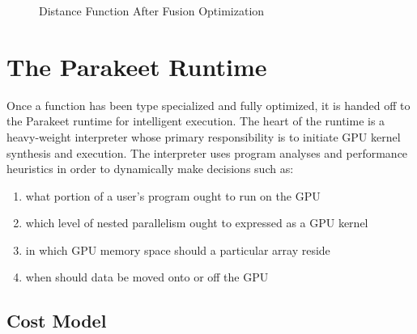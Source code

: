 \documentclass[10pt,twocolumn]{article}
\begin{document}
\begin{figure}[h!]

\caption{Distance Function After Fusion Optimization}
\label{DistFuse}
\end{figure}

\section{The Parakeet Runtime}
\label{runtime}

Once a function has been type specialized and fully optimized, it is handed off to the Parakeet runtime for intelligent execution. The heart of the runtime is a heavy-weight interpreter whose primary responsibility is to initiate GPU kernel synthesis and execution. The interpreter uses program analyses and performance heuristics in order to dynamically make decisions such as: 
\begin{enumerate}
\item what portion of a user's program ought to run on the GPU 
\item which level of nested parallelism ought to expressed as a GPU kernel
\item in which GPU memory space should a particular array reside 
\item when should data be moved onto or off the GPU
\end{enumerate} 

\subsection{Cost Model}
\label{costmodel}
\end{document}
